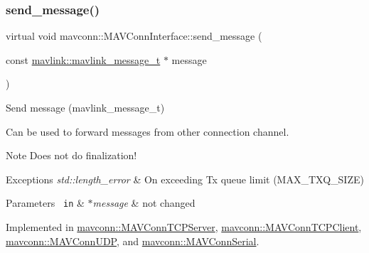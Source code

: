 \subsubsection{\texorpdfstring{send\_message()}{send\_message()}\hspace{0.1cm}{\footnotesize\ttfamily [9/10]}}
{\footnotesize\ttfamily virtual void mavconn\+::\+M\+A\+V\+Conn\+Interface\+::send\+\_\+message (\begin{DoxyParamCaption}\item[{const \mbox{\hyperlink{include__v0_89_2mavlink__types_8h_a63b963764c09dc72f4910c1521e325b9}{mavlink\+::mavlink\+\_\+message\+\_\+t}} $\ast$}]{message }\end{DoxyParamCaption})\hspace{0.3cm}{\ttfamily [pure virtual]}}



Send message (mavlink\+\_\+message\+\_\+t) 

Can be used to forward messages from other connection channel.

\begin{DoxyNote}{Note}
Does not do finalization!
\end{DoxyNote}

\begin{DoxyExceptions}{Exceptions}
{\em std\+::length\+\_\+error} & On exceeding Tx queue limit (M\+A\+X\+\_\+\+T\+X\+Q\+\_\+\+S\+I\+ZE) \\
\hline
\end{DoxyExceptions}

\begin{DoxyParams}[1]{Parameters}
\mbox{\texttt{ in}}  & {\em $\ast$message} & not changed \\
\hline
\end{DoxyParams}


Implemented in \mbox{\hyperlink{group__mavconn_gacbae4efba2ed887e4a731ca60dceb0a6}{mavconn\+::\+M\+A\+V\+Conn\+T\+C\+P\+Server}}, \mbox{\hyperlink{group__mavconn_ga6f835299707df78f3694cef5853139d4}{mavconn\+::\+M\+A\+V\+Conn\+T\+C\+P\+Client}}, \mbox{\hyperlink{group__mavconn_gae33a3895701a613a72d7fc1ab9bbb3d8}{mavconn\+::\+M\+A\+V\+Conn\+U\+DP}}, and \mbox{\hyperlink{group__mavconn_ga452a97c9cd256b591eee063a1927a93a}{mavconn\+::\+M\+A\+V\+Conn\+Serial}}.

\mbox{\label{group__mavconn_ga204ee5ba0dc31519b0ea7a9ac50d486c}} 
